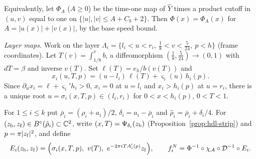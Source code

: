 Equivalently, let $\Phi_A$ ($A\ge0$) be the time-one map of $\widehat Y$ times a product cutoff in $(u,v)$ equal to one on $\{|u|,|v|\le A+C_b+2\}$. Then $\Phi(x)=\Phi_A(x)$ for $A=|u(x)|+|v(x)|$, by the base speed bound.

\emph{Layer maps.} Work on the layer $\Lambda_i=\{l_i<u<r_i,\ \frac18<v<\frac5{24},\ p<h\}$ (frame coordinates). Let $T(v)=\int_{1/8}^vb$, a diffeomorphism $(\frac18,\frac5{24})\to(0,1)$ with $dT=\beta$ and inverse $v(T)$. Set $\ell(T)=e_h/b(v(T))$ and
\[
 x_i(u,T,p)=(u-l_i)\,\ell(T)+\varsigma_i(u)\,h_i(p).
\]
Since $\partial_ux_i=\ell+\varsigma_i'h_i>0$, $x_i=0$ at $u=l_i$ and $x_i>h_i(p)$ at $u=r_i$, there is a unique root $u=\sigma_i(x,T,p)\in(l_i,r_i)$ for $0<x<h_i(p)$, $0<T<1$.

For $1\le i\le k$ put $\bar\rho_i=(\rho_i+a_i)/2$, $\delta_i=a_i-\bar\rho_i$ and $\hat\rho_i=\bar\rho_i+\delta_i/4$. For $(z_{\rm b},z_{\rm f})\in B^{\circ}(\hat\rho_i)\subset\mathbb{C}^2$, write $(x,T)=\Psi_{\delta_i}(z_{\rm b})$ (Proposition~\ref{prop:hdl-strip}) and $p=\pi|z_{\rm f}|^2$, and define
\[
 E_i(z_{\rm b},z_{\rm f})=\Bigl(\sigma_i(x,T,p),\ v(T),\ e^{-2\pi iTA_i'(p)}z_{\rm f}\Bigr),\qquad
 f^N_i=\Phi^{-1}\circ\chi_{\mathcal A}\circ\mathcal D^{-1}\circ E_i .
\]

